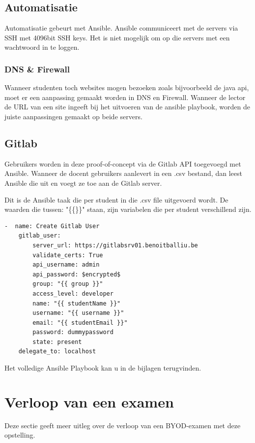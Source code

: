 \subsection{Automatisatie}
Automatisatie gebeurt met Ansible. Ansible communiceert met de servers via SSH met 4096bit SSH keys. Het is niet mogelijk om op die servers met een wachtwoord in te loggen.

\subsubsection{DNS \& Firewall}
Wanneer studenten toch websites mogen bezoeken zoals bijvoorbeeld de java api, moet er een aanpassing gemaakt worden in DNS en Firewall. Wanneer de lector de URL van een site ingeeft bij het uitvoeren van de ansible playbook, worden de juiste aanpassingen gemaakt op beide servers.

\subsection{Gitlab}
Gebruikers worden in deze proof-of-concept via de Gitlab API toegevoegd met Ansible. Wanneer de docent gebruikers aanlevert in een .csv bestand, dan leest Ansible die uit en voegt ze toe aan de Gitlab server. 

Dit is de Ansible taak die per student in die .csv file uitgevoerd wordt. De waarden die tussen: "\{\{\}\}"   staan, zijn variabelen die per student verschillend zijn.
\lstset{basicstyle=\ttfamily}
\begin{lstlisting}
-  name: Create Gitlab User
	gitlab_user:
		server_url: https://gitlabsrv01.benoitballiu.be
		validate_certs: True
		api_username: admin
		api_password: $encrypted$
		group: "{{ group }}"
		access_level: developer
		name: "{{ studentName }}"
		username: "{{ username }}"
		email: "{{ studentEmail }}"
		password: dummypassword
		state: present
	delegate_to: localhost
\end{lstlisting}

Het volledige Ansible Playbook kan u in de bijlagen terugvinden.

\section{Verloop van een examen}
Deze sectie geeft meer uitleg over de verloop van een BYOD-examen met deze opstelling.

